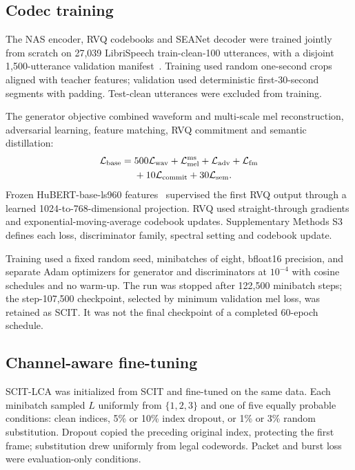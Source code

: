 \documentclass[final,5p,times,twocolumn]{elsarticle}
\begin{document}
\subsection{Codec training}
The NAS encoder, RVQ codebooks and SEANet decoder were trained jointly from scratch on 27,039 LibriSpeech train-clean-100 utterances, with a disjoint 1,500-utterance validation manifest~\cite{librispeech}. Training used random one-second crops aligned with teacher features; validation used deterministic first-30-second segments with padding. Test-clean utterances were excluded from training.

The generator objective combined waveform and multi-scale mel reconstruction, adversarial learning, feature matching, RVQ commitment and semantic distillation:
\begin{equation}
\begin{split}
 \mathcal L_{\rm base}={}&500\mathcal L_{\rm wav}
 +\mathcal L_{\rm mel}^{\rm ms}
 +\mathcal L_{\rm adv}+\mathcal L_{\rm fm}\\
 &+10\mathcal L_{\rm commit}+30\mathcal L_{\rm sem}.
\end{split}
\end{equation}
Frozen HuBERT-base-ls960 features~\cite{hubert} supervised the first RVQ output through a learned 1024-to-768-dimensional projection. RVQ used straight-through gradients and exponential-moving-average codebook updates. Supplementary Methods S3 defines each loss, discriminator family, spectral setting and codebook update.

Training used a fixed random seed, minibatches of eight, bfloat16 precision, and separate Adam optimizers for generator and discriminators at $10^{-4}$ with cosine schedules and no warm-up. The run was stopped after 122,500 minibatch steps; the step-107,500 checkpoint, selected by minimum validation mel loss, was retained as SCIT. It was not the final checkpoint of a completed 60-epoch schedule.

\subsection{Channel-aware fine-tuning}
SCIT-LCA was initialized from SCIT and fine-tuned on the same data. Each minibatch sampled $L$ uniformly from $\{1,2,3\}$ and one of five equally probable conditions: clean indices, 5\% or 10\% index dropout, or 1\% or 3\% random substitution. Dropout copied the preceding original index, protecting the first frame; substitution drew uniformly from legal codewords. Packet and burst loss were evaluation-only conditions.
\end{document}
